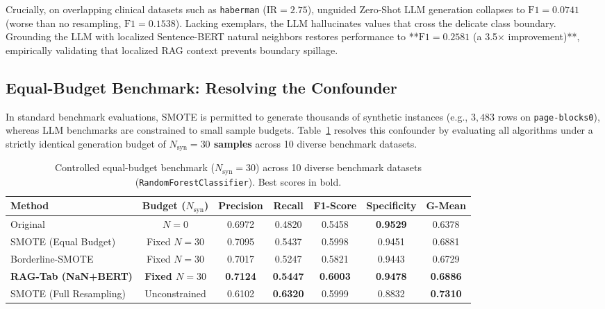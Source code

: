 \documentclass[sn-basic]{sn-jnl}
\begin{document}
Crucially, on overlapping clinical datasets such as \texttt{haberman} ($\text{IR} = 2.75$), unguided Zero-Shot LLM generation collapses to $\text{F1} = 0.0741$ (worse than no resampling, $\text{F1} = 0.1538$). Lacking exemplars, the LLM hallucinates values that cross the delicate class boundary. Grounding the LLM with localized Sentence-BERT natural neighbors restores performance to **$\text{F1} = 0.2581$ (a 3.5$\times$ improvement)**, empirically validating that localized RAG context prevents boundary spillage.

\subsection{Equal-Budget Benchmark: Resolving the Confounder}
\label{subsec:equal_budget}
In standard benchmark evaluations, SMOTE is permitted to generate thousands of synthetic instances (e.g., $3,483$ rows on \texttt{page-blocks0}), whereas LLM benchmarks are constrained to small sample budgets. Table~\ref{tab:equal_budget} resolves this confounder by evaluating all algorithms under a strictly identical generation budget of \textbf{$N_{\text{syn}} = 30$ samples} across 10 diverse benchmark datasets.

\begin{table}[t]
\centering
\caption{Controlled equal-budget benchmark ($N_{\text{syn}} = 30$) across 10 diverse benchmark datasets (\texttt{RandomForestClassifier}). Best scores in bold.}
\label{tab:equal_budget}
\begin{tabular}{lcccccc}
\toprule
\textbf{Method} & \textbf{Budget ($N_{\text{syn}}$)} & \textbf{Precision} & \textbf{Recall} & \textbf{F1-Score} & \textbf{Specificity} & \textbf{G-Mean} \\
\midrule
Original & $N = 0$ & 0.6972 & 0.4820 & 0.5458 & \textbf{0.9529} & 0.6378 \\
SMOTE (Equal Budget) & Fixed $N = 30$ & 0.7095 & 0.5437 & 0.5998 & 0.9451 & 0.6881 \\
Borderline-SMOTE & Fixed $N = 30$ & 0.7017 & 0.5247 & 0.5821 & 0.9443 & 0.6729 \\
\textbf{RAG-Tab (NaN+BERT)} & \textbf{Fixed $N = 30$} & \textbf{0.7124} & \textbf{0.5447} & \textbf{0.6003} & \textbf{0.9478} & \textbf{0.6886} \\
\midrule
SMOTE (Full Resampling) & Unconstrained & 0.6102 & \textbf{0.6320} & 0.5999 & 0.8832 & \textbf{0.7310} \\
\bottomrule
\end{tabular}
\end{table}
\end{document}

